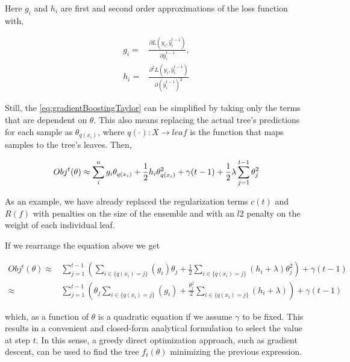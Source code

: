 Here $g_i$ and $h_i$ are first and second order approximations of the loss function with,

\begin{equation}
\begin{split}
g_i = & \frac{\partial L(y_i, \hat{y}^{t-1}_i)}{\partial \hat{y}^{t-1}_i},  \\
h_i = & \frac{\partial^2 L(y_i, \hat{y}^{t-1}_i)}{\partial {(\hat{y}^{t-1}_i)}^2 }
\end{split}
\end{equation}

Still, the \cref{eq:gradientBoostingTaylor} can be simplified by taking only the terms that are dependent on $\theta$.
This also means replacing the actual tree's predictions for each sample as $\theta_{q(x_i)}$, where $q(\cdot): X \rightarrow leaf$ is the function that maps samples to the tree's leaves. Then,


\begin{equation}\label{eq:gb-objSteps1}
Obj^t(\theta) \approx \sum_i^n {g_i \theta_{q(x_i)} + \frac{1}{2} h_i \theta_{q(x_i)}^2 } + \gamma ({t-1}) + \frac{1}{2}\lambda \sum_{j=1}^{t-1} \theta_j^2 \\
\end{equation}

As an example, we have already replaced the regularization terms $c(t)$ and $R(f)$ with penalties on the size of the ensemble and with an $l$2 penalty on the weight of each individual leaf.

If we rearrange the equation above we get

\begin{equation}\label{eq:gb-objSteps2}
\begin{split}
Obj^t(\theta) \approx & \sum_{j=1}^{t-1} \left( \sum_{i \in \{q(x_i)=j\}} (g_i )\theta_{j} + \frac{1}{2} \sum_{i \in \{q(x_i)=j\}} (h_i + \lambda ) \theta_{j}^2 \right) + \gamma ({t-1}) \\
\approx & \sum_{j=1}^{t-1} \left( \theta_{j}\sum_{i \in \{q(x_i)=j\}} (g_i ) + \frac{\theta_{j}^2}{2} \sum_{i \in \{q(x_i)=j\}} (h_i + \lambda ) \right) + \gamma ({t-1})
\end{split}
\end{equation}

which, as a function of $\theta$ is a quadratic equation if we assume $\gamma$ to be fixed.
This results in a convenient and closed-form analytical formulation to select the value at step $t$.
In this sense, a greedy direct optimization approach, such as gradient descent, can be used to find the tree $f_t(\theta)$ minimizing the previous expression.

